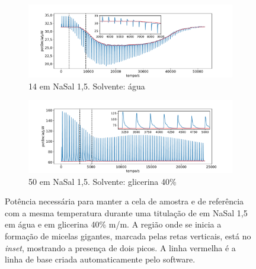 		\begin{figure}
			\begin{subfigure}{\textwidth}
				\centering
				\includegraphics[width=\textwidth]{imagens/itc/exemplo_raw_mg}
				\caption{\TTAB{} 14 \mM em NaSal 1,5\mM. Solvente: água}
				\label{fig:itc_raw_mg}
			\end{subfigure}
		
			\begin{subfigure}{\textwidth}
				\centering
				\includegraphics[width=\textwidth]{imagens/itc/raw_itc_glicerina}
				\caption{\TTAB{} 50 \mM em NaSal 1,5\mM. Solvente: glicerina 40\%}
				\label{fig:raw_itc_mg_glicerina}
			\end{subfigure}
			
			\caption{Potência necessária para manter a cela de amostra e de referência com a mesma temperatura durante uma titulação de \TTAB{} em NaSal 1,5 \mM{} em água e em glicerina 40\% m/m. A região onde se inicia a formação de micelas gigantes, marcada pelas retas verticais, está no \emph{inset}, mostrando a presença de dois picos. A linha vermelha é a linha de base criada automaticamente pelo software.}
			\label{fig:itc_raw_agua_glicerina}
		\end{figure}
	

